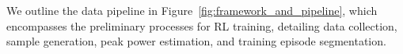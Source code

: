 {\color{black} 
We outline the data pipeline in Figure~\ref{fig:framework_and_pipeline}, which encompasses the preliminary processes for RL training, detailing data collection, sample generation, peak power estimation, and training episode segmentation. 

}
